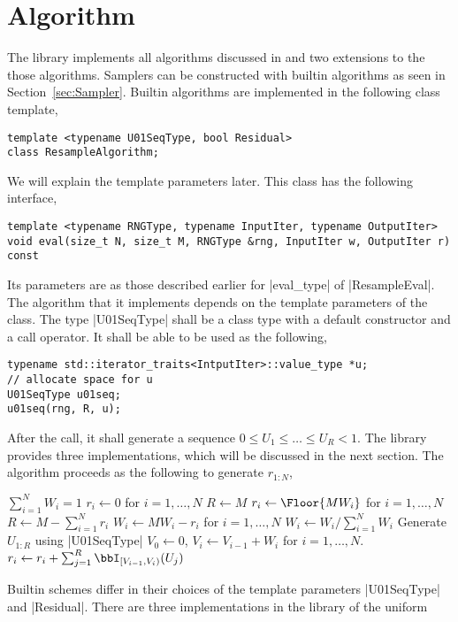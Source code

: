 \section{Algorithm}
\label{sec:Algorithm}

The library implements all algorithms discussed in \cite{Douc:2005wa} and two
extensions to the those algorithms. Samplers can be constructed with builtin
algorithms as seen in Section~\ref{sec:Sampler}. Builtin algorithms are
implemented in the following class template,
\begin{Verbatim}
template <typename U01SeqType, bool Residual>
class ResampleAlgorithm;
\end{Verbatim}
We will explain the template parameters later. This class has the following
interface,
\begin{Verbatim}
template <typename RNGType, typename InputIter, typename OutputIter>
void eval(size_t N, size_t M, RNGType &rng, InputIter w, OutputIter r) const
\end{Verbatim}
Its parameters are as those described earlier for |eval_type| of
|ResampleEval|. The algorithm that it implements depends on the template
parameters of the class. The type |U01SeqType| shall be a class type with a
default constructor and a call operator. It shall be able to be used as the
following,
\begin{Verbatim}
typename std::iterator_traits<IntputIter>::value_type *u;
// allocate space for u
U01SeqType u01seq;
u01seq(rng, R, u);
\end{Verbatim}
After the call, it shall generate a sequence $0 \le U_1 \le \dots\le U_R < 1$.
The library provides three implementations, which will be discussed in the next
section. The algorithm proceeds as the following to generate $r_{1:N}$,
\begin{algorithmic}
  \REQUIRE $\sum_{i=1}^N W_i = 1$
  \STATE $r_i \leftarrow 0$ for $i = 1,\dots,N$
  \STATE $R \leftarrow M$
  \ELSE
  \STATE $r_i \leftarrow \Floor{MW_i}$ for $i = 1,\dots,N$
  \STATE $R \leftarrow M - \sum_{i=1}^N r_i$
  \STATE $W_i \leftarrow MW_i - r_i$ for $i = 1,\dots,N$
  \STATE $W_i \leftarrow W_i / \sum_{i=1}^NW_i$
  \ENDIF
  \STATE Generate $U_{1:R}$ using |U01SeqType|
  \STATE $V_0 \leftarrow 0$, $V_i \leftarrow V_{i - 1} + W_i$ for $i =
  1,\dots,N$.
  \STATE $r_i \leftarrow r_i + \sum_{j=1}^R\bbI_{[V_{i-1},V_i)}(U_j)$
\end{algorithmic}
Builtin schemes differ in their choices of the template parameters |U01SeqType|
and |Residual|. There are three implementations in the library of the uniform
